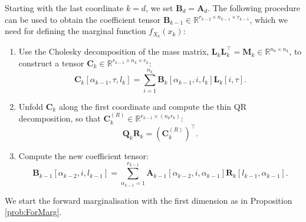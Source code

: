 \begin{prop}
	\label{prob:backMarg}
	Starting with the last coordinate $k = d$, we set $\bm{B}_d = \bm{A}_d$. The following procedure can be used to obtain the coefficient tensor $\bm{B}_{k-1} \in \mathbb{R}^{r_{k-2} \times n_{k-1} \times r_{k-1}}$, which we need for defining the marginal function $f_{X_k}(x_k)$:
	\begin{enumerate}
		\item Use the Cholesky decomposition of the mass matrix, $\bm{L}_k \bm{L}_k^\top = \bm{M}_k \in \mathbb{R}^{n_k \times n_k}$, to construct a tensor $\bm{C}_k \in \mathbb{R}^{r_{k-1} \times n_k \times r_k}$:
		\begin{equation}
			\bm{C}_k[\alpha_{k-1}, \tau, l_k] = \sum_{i=1}^{n_k} \bm{B}_k[\alpha_{k-1}, i, l_k] \bm{L}_k[i, \tau].
		\end{equation}
		\item Unfold $\bm{C}_k$ along the first coordinate and compute the thin QR decomposition, so that $\bm{C}_k^{(R)} \in \mathbb{R}^{r_{k-1} \times (n_k r_k)}$:
		\begin{equation}
			\bm{Q}_k \bm{R}_k = {(\bm{C}_k^{(R)})}^{\top}.
		\end{equation}
		\item Compute the new coefficient tensor:
		\begin{equation}
			\bm{B}_{k-1}[\alpha_{k-2}, i, l_{k-1}] = \sum_{\alpha_{k-1}=1}^{r_{k-1}} \bm{A}_{k-1}[\alpha_{k-2}, i, \alpha_{k-1}] \bm{R}_k[l_{k-1}, \alpha_{k-1}].
		\end{equation}
	\end{enumerate}
\end{prop}
We start the forward marginalisation with the first dimension as in Proposition \ref{prob:ForMarg}.
